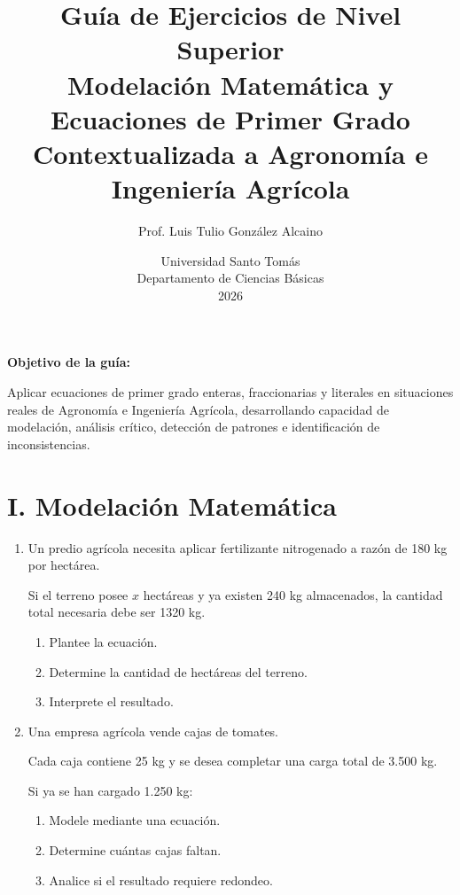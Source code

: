 \documentclass[12pt]{article}
\title{\textbf{Guía de Ejercicios de Nivel Superior}\\
	Modelación Matemática y Ecuaciones de Primer Grado\\
	Contextualizada a Agronomía e Ingeniería Agrícola}
\author{Prof. Luis Tulio González Alcaino}
\date{Universidad Santo Tomás \\ Departamento de Ciencias Básicas \\ 2026}
\begin{document}
	
	\maketitle
	
	\vspace{-1em}
	
	\begin{tcolorbox}[colback=green!5,colframe=black]
		\textbf{Objetivo de la guía:}
		
		Aplicar ecuaciones de primer grado enteras, fraccionarias y literales
		en situaciones reales de Agronomía e Ingeniería Agrícola,
		desarrollando capacidad de modelación, análisis crítico,
		detección de patrones e identificación de inconsistencias.
	\end{tcolorbox}
	
	\section*{I. Modelación Matemática}
	
	\begin{enumerate}[label=\textbf{\arabic*.}]
		
		\item Un predio agrícola necesita aplicar fertilizante nitrogenado
		a razón de 180 kg por hectárea.
		
		Si el terreno posee \(x\) hectáreas y ya existen 240 kg almacenados,
		la cantidad total necesaria debe ser 1320 kg.
		
		\begin{enumerate}[label=\alph*)]
			\item Plantee la ecuación.
			\item Determine la cantidad de hectáreas del terreno.
			\item Interprete el resultado.
		\end{enumerate}
		
		
		\item Una empresa agrícola vende cajas de tomates.
		
		Cada caja contiene 25 kg y se desea completar
		una carga total de 3.500 kg.
		
		Si ya se han cargado 1.250 kg:
		
		\begin{enumerate}[label=\alph*)]
			\item Modele mediante una ecuación.
			\item Determine cuántas cajas faltan.
			\item Analice si el resultado requiere redondeo.
		\end{enumerate}
		
	\end{enumerate}
	
\end{document}
